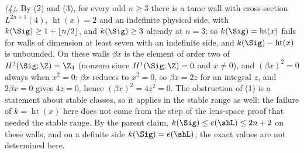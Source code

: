 \emph{(4).} By (2) and (3), for every odd $n \geq 3$ there is a tame wall with cross-section $L^{2n+1}(4)$, $\operatorname{ht}(x) = 2$ and an indefinite physical side, with $k(\Sig) \geq 1 + \lfloor n/2 \rfloor$, and $k(\Sig) \geq 3$ already at $n = 3$; so $k(\Sig) = \operatorname{ht}(x)$ fails for walls of dimension at least seven with an indefinite side, and $k(\Sig) - \operatorname{ht}(x)$ is unbounded. On these walls $\beta x$ is the element of order two of $H^{2}(\Sig; \Z) = \Z_{4}$ (nonzero since $H^{1}(\Sig; \Z) = 0$ and $x \neq 0$), and $(\beta x)^{2} = 0$ always when $x^{2} = 0$: $\beta x$ reduces to $x^{2} = 0$, so $\beta x = 2z$ for an integral $z$, and $2\beta x = 0$ gives $4z = 0$, hence $(\beta x)^{2} = 4z^{2} = 0$. The obstruction of (1) is a statement about stable classes, so it applies in the stable range as well: the failure of $k = \operatorname{ht}(x)$ here does not come from the step of the lens-space proof that needed the stable range. By the parent claim, $k(\Sig) \leq e(\shL) \leq 2n + 2$ on these walls, and on a definite side $k(\Sig) = e(\shL)$; the exact values are not determined here.
